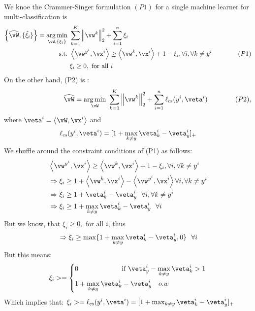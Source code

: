 \documentclass[a4paper,11pt]{article}
\begin{document}
\begin{mlsolution}
We knoe the Crammer-Singer formulation $(P1)$ for a single machine learner for multi-classification is
\begin{align*}
\bc{\widehat\vW, \{\hat\xi_i\}} = \underset{\vW,\bc{\xi_i}}{\arg\min}&\ \sum_{k=1}^K\norm{\vw^k}_2^2 + \sum_{i=1}^n\xi_i\\
\text{s.t.} &\ \ip{\vw^{y^i}}{\vx^i} \geq \ip{\vw^k}{\vx^i} + 1 - \xi_i, \forall i, \forall k \neq y^i\qquad\qquad{(P1)}\\
&\ \xi_i \geq 0, \text{ for all } i
\end{align*}
On the other hand, (P2) is :
	\[
	\phantom{\hspace{20ex}}\widehat\vW = \underset{\vW}{\arg\min}\ \sum_{k=1}^K\norm{\vw^k}_2^2 + \sum_{i=1}^n\ell_\text{cs}(y^i,\veta^i)\qquad\qquad{(P2)},
	\]
	where $\veta^i = \ip{\vW}{\vx^i}$ and
	\[
	\ell_\text{cs}(y^i,\veta^i) = [1 + \max_{k \neq y}\veta^i_k - \veta^i_y]_+
	\]
We shuffle around the constraint conditions of (P1) as follows: \\
\begin{align*}
   &\ip{\vw^{y^i}}{\vx^i} \geq \ip{\vw^k}{\vx^i} + 1 - \xi_i, \forall i, \forall k \neq y^i \\
   &\Rightarrow \xi_i \geq 1 + \ip{\vw^k}{\vx^i} - \ip{\vw^{y^i}}{\vx^i} \forall i, \forall k \neq y^i \\
   &\Rightarrow \xi_i \geq 1 + \veta^i_k - \veta^i_y \ \ \forall i, \forall k \neq y^i \\
   &\Rightarrow \xi_i \geq 1 + \max_{k \neq y}\veta^i_k - \veta^i_y \ \ \forall i \\
\end{align*}
But we know, that $\xi_i \geq 0, \text{ for all } i$, thus
\begin{align*}
   &\Rightarrow \xi_i \geq \max\{1 + \max_{k \neq y}\veta^i_k - \veta^i_y , 0 \} \ \ \forall i \\
\end{align*}
But this means:
\abovedisplayskip=0pt\relax
\[
  \xi_i >=
\left\{
\!
\begin{aligned}
&0   \ \ \ \ \ \ \ \ \ \ \ \ \ \ \ \ \  \ \text{ if } \veta^i_y - \max_{k \neq y}\veta^i_k > 1\\
&1 + \max_{k \neq y}\veta^i_k - \veta^i_y  \ \ \ o.w\\
\end{aligned}
\right.
\]
Which implies that: $\xi_i >= \ell_\text{cs}(y^i,\veta^i) = [1 + \max_{k \neq y}\veta^i_k - \veta^i_y]_+$ \\

\end{mlsolution}
\end{document}
